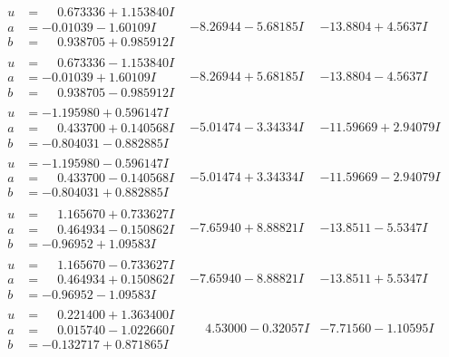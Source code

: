 \documentclass[1p]{elsarticle_modified}
\theoremstyle{definition}
\begin{document}
$$\begin{array}{c|c|c}
\begin{aligned}
u &= \phantom{-}0.673336 + 1.153840 I \\
a &= -0.01039 - 1.60109 I \\
b &= \phantom{-}0.938705 + 0.985912 I\end{aligned}
 & -8.26944 - 5.68185 I & -13.8804 + 4.5637 I \\ \hline\begin{aligned}
u &= \phantom{-}0.673336 - 1.153840 I \\
a &= -0.01039 + 1.60109 I \\
b &= \phantom{-}0.938705 - 0.985912 I\end{aligned}
 & -8.26944 + 5.68185 I & -13.8804 - 4.5637 I \\ \hline\begin{aligned}
u &= -1.195980 + 0.596147 I \\
a &= \phantom{-}0.433700 + 0.140568 I \\
b &= -0.804031 - 0.882885 I\end{aligned}
 & -5.01474 - 3.34334 I & -11.59669 + 2.94079 I \\ \hline\begin{aligned}
u &= -1.195980 - 0.596147 I \\
a &= \phantom{-}0.433700 - 0.140568 I \\
b &= -0.804031 + 0.882885 I\end{aligned}
 & -5.01474 + 3.34334 I & -11.59669 - 2.94079 I \\ \hline\begin{aligned}
u &= \phantom{-}1.165670 + 0.733627 I \\
a &= \phantom{-}0.464934 - 0.150862 I \\
b &= -0.96952 + 1.09583 I\end{aligned}
 & -7.65940 + 8.88821 I & -13.8511 - 5.5347 I \\ \hline\begin{aligned}
u &= \phantom{-}1.165670 - 0.733627 I \\
a &= \phantom{-}0.464934 + 0.150862 I \\
b &= -0.96952 - 1.09583 I\end{aligned}
 & -7.65940 - 8.88821 I & -13.8511 + 5.5347 I \\ \hline\begin{aligned}
u &= \phantom{-}0.221400 + 1.363400 I \\
a &= \phantom{-}0.015740 - 1.022660 I \\
b &= -0.132717 + 0.871865 I\end{aligned}
 & \phantom{-}4.53000 - 0.32057 I & -7.71560 - 1.10595 I \\ \hline\begin{aligned}

\end{aligned}
\end{array}$$
\end{document}
